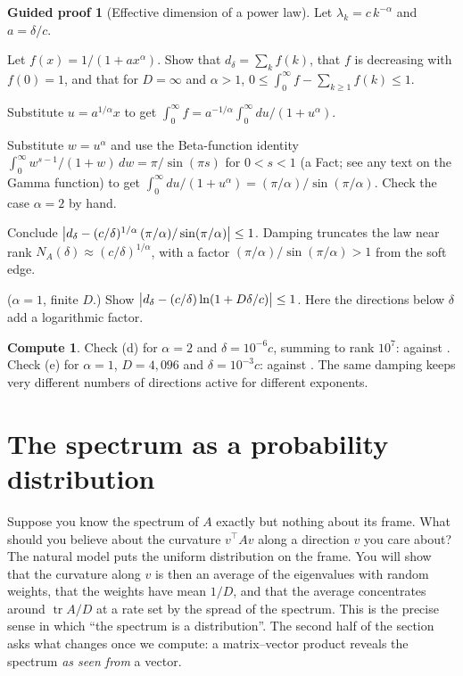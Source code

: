 \documentclass[11pt,a4paper]{article}
\DeclareMathOperator{\tr}{tr}
\DeclarePairedDelimiter{\abs}{\lvert}{\rvert}
\theoremstyle{plain}
\theoremstyle{definition}
\newtheorem{guided}[proposition]{Guided proof}
\newtheorem{compute}[proposition]{Compute}
\theoremstyle{remark}
\begin{document}
\begin{guided}[Effective dimension of a power law]\label{gp:deff}
Let $\lambda_k=c\,k^{-\alpha}$ and $a=\delta/c$.
\begin{steps}
\item Let $f(x)=1/(1+ax^\alpha)$. Show that $d_\delta=\sum_kf(k)$, that $f$ is decreasing with $f(0)=1$, and that
  for $D=\infty$ and $\alpha>1$, $0\le\int_0^\infty f-\sum_{k\ge1}f(k)\le1$.
\item Substitute $u=a^{1/\alpha}x$ to get $\int_0^\infty f=a^{-1/\alpha}\int_0^\infty du/(1+u^\alpha)$.
\item Substitute $w=u^\alpha$ and use the Beta-function identity $\int_0^\infty w^{s-1}/(1+w)\,dw=\pi/\sin(\pi s)$
  for $0<s<1$ (a Fact; see any text on the Gamma function) to get
  $\int_0^\infty du/(1+u^\alpha)=(\pi/\alpha)/\sin(\pi/\alpha)$. Check the case $\alpha=2$ by hand.
\item Conclude $\abs[\big]{d_\delta-(c/\delta)^{1/\alpha}\,(\pi/\alpha)/\sin(\pi/\alpha)}\le1$. Damping truncates
  the law near rank $N_A(\delta)\approx(c/\delta)^{1/\alpha}$, with a factor $(\pi/\alpha)/\sin(\pi/\alpha)>1$ from
  the soft edge.
\item ($\alpha=1$, finite $D$.) Show $\abs[\big]{d_\delta-(c/\delta)\ln(1+D\delta/c)}\le1$. Here the directions below
  $\delta$ add a logarithmic factor.
\end{steps}
\end{guided}

\begin{compute}\label{cp:deff}
Check (d) for $\alpha=2$ and $\delta=10^{-6}c$, summing to rank $10^7$: \NumDdeltaExact{} against \NumDdeltaAsym.
Check (e) for $\alpha=1$, $D=4{,}096$ and $\delta=10^{-3}c$: \NumDdeltaLogExact{} against \NumDdeltaLogAsym. The
same damping keeps very different numbers of directions active for different exponents.
\end{compute}

\section{The spectrum as a probability distribution}\label{sec:distribution}

Suppose you know the spectrum of $A$ exactly but nothing about its frame. What should you believe about the curvature
$v^\top Av$ along a direction $v$ you care about? The natural model puts the uniform distribution on the frame. You
will show that the curvature along $v$ is then an average of the eigenvalues with random weights, that the weights
have mean $1/D$, and that the average concentrates around $\tr A/D$ at a rate set by the spread of the spectrum. This
is the precise sense in which ``the spectrum is a distribution''. The second half of the section asks what changes
once we compute: a matrix--vector product reveals the spectrum \emph{as seen from} a vector.
\end{document}
